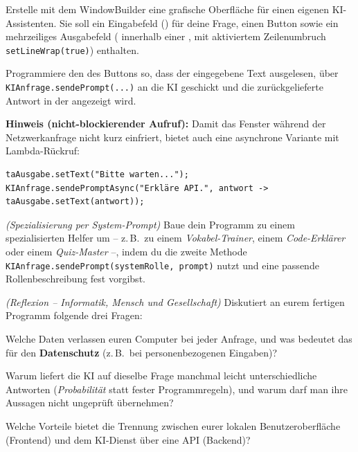 \begin{compactenum}[a)]
\item Erstelle mit dem WindowBuilder eine grafische Oberfläche für einen
eigenen KI-Assistenten. Sie soll ein Eingabefeld () für
deine Frage, einen Button  sowie ein mehrzeiliges
Ausgabefeld ( innerhalb einer , mit
aktiviertem Zeilenumbruch \lstinline|setLineWrap(true)|) enthalten.

\item Programmiere den  des Buttons so, dass der
eingegebene Text ausgelesen, über \linebreak \lstinline|KIAnfrage.sendePrompt(...)| an die
KI geschickt und die zurückgelieferte Antwort in der 
angezeigt wird.

\noindent \textbf{Hinweis (nicht-blockierender Aufruf):} Damit das Fenster
während der Netzwerkanfrage nicht kurz einfriert, bietet 
auch eine asynchrone Variante mit Lambda-Rückruf:
\begin{lstlisting}
taAusgabe.setText("Bitte warten...");
KIAnfrage.sendePromptAsync("Erkläre API.", antwort -> taAusgabe.setText(antwort));
\end{lstlisting}


\item \emph{(Spezialisierung per System-Prompt)} Baue dein Programm zu einem
spezialisierten Helfer um -- z.\,B.\ zu einem \emph{Vokabel-Trainer}, einem
\emph{Code-Erklärer} oder einem \emph{Quiz-Master} --, indem du die zweite
Methode \lstinline|KIAnfrage.sendePrompt(systemRolle, prompt)| nutzt und eine
passende Rollenbeschreibung fest vorgibst.

\item \emph{(Reflexion -- Informatik, Mensch und Gesellschaft)} Diskutiert an
eurem fertigen Programm folgende drei Fragen:
\begin{compactenum}[1.]
  \item Welche Daten verlassen euren Computer bei jeder Anfrage, und was
  bedeutet das für den \textbf{Datenschutz} (z.\,B.\ bei personenbezogenen
  Eingaben)?
  \item Warum liefert die KI auf dieselbe Frage manchmal leicht
  unterschiedliche Antworten (\emph{Probabilität} statt fester
  Programmregeln), und warum darf man ihre Aussagen nicht ungeprüft
  übernehmen?
  \item Welche Vorteile bietet die Trennung zwischen eurer lokalen
  Benutzeroberfläche (Frontend) und dem KI-Dienst über eine API (Backend)?
\end{compactenum}
\end{compactenum}


